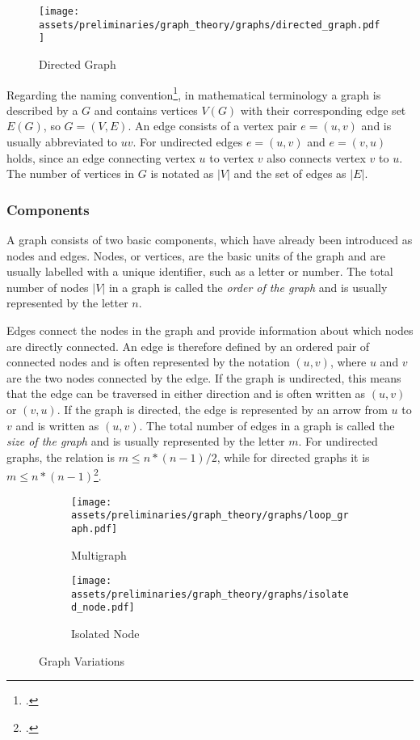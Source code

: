 \documentclass[a4paper, 12pt]{report}
\begin{document}
\begin{figure}
\centering
\texttt{[image: assets/preliminaries/graph\_theory/graphs/directed\_graph.pdf]}
\caption{Directed Graph}
\label{fig:directed-graph}
\end{figure}

Regarding the naming convention\footcite{wilson1979introduction}, in mathematical terminology a graph is described by a $G$ and contains vertices $V(G)$ with their corresponding edge set $E(G)$, so $G = (V, E)$. An edge consists of a vertex pair $e = (u, v)$ and is usually abbreviated to $uv$. For undirected edges $e = (u, v)$ and $e = (v, u)$ holds, since an edge connecting vertex $u$ to vertex $v$ also connects vertex $v$ to $u$. The number of vertices in $G$ is notated as $|V|$ and the set of edges as $|E|$.

\subsubsection{Components}\label{subsec:components}

A graph consists of two basic components, which have already been introduced as nodes and edges. Nodes, or vertices, are the basic units of the graph and are usually labelled with a unique identifier, such as a letter or number. The total number of nodes $|V|$ in a graph is called the \textit{order of the graph} and is usually represented by the letter $n$.

Edges connect the nodes in the graph and provide information about which nodes are directly connected. An edge is therefore defined by an ordered pair of connected nodes and is often represented by the notation $(u, v)$, where $u$ and $v$ are the two nodes connected by the edge. If the graph is undirected, this means that the edge can be traversed in either direction and is often written as $(u, v)$ or $(v, u)$. If the graph is directed, the edge is represented by an arrow from $u$ to $v$ and is written as $(u, v)$. The total number of edges in a graph is called the \textit{size of the graph} and is usually represented by the letter $m$. For undirected graphs, the relation is \(m \leq n * (n - 1) / 2\), while for directed graphs it is \(m \leq n * (n - 1)\)\footcite{earl1979architectural}.

\begin{figure}
\centering
\begin{subfigure}{.5\textwidth}
\centering
\texttt{[image: assets/preliminaries/graph\_theory/graphs/loop\_graph.pdf]}
\caption{Multigraph}
\label{fig:multigraph}
\end{subfigure}%
\begin{subfigure}{.5\textwidth}
\centering
\texttt{[image: assets/preliminaries/graph\_theory/graphs/isolated\_node.pdf]}
\caption{Isolated Node}
\label{fig:isolated-node}
\end{subfigure}
\caption{Graph Variations}
\label{fig:graph-variations}
\end{figure}
\end{document}
